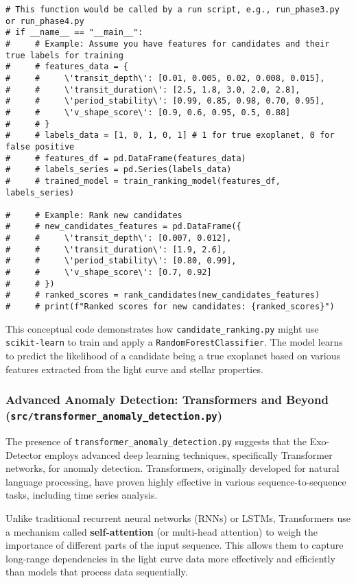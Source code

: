 \documentclass{article}
\begin{document}
\begin{lstlisting}[caption={Conceptual Candidate Ranking Logic}]
# This function would be called by a run script, e.g., run_phase3.py or run_phase4.py
# if __name__ == "__main__":
#     # Example: Assume you have features for candidates and their true labels for training
#     # features_data = {
#     #     \'transit_depth\': [0.01, 0.005, 0.02, 0.008, 0.015],
#     #     \'transit_duration\': [2.5, 1.8, 3.0, 2.0, 2.8],
#     #     \'period_stability\': [0.99, 0.85, 0.98, 0.70, 0.95],
#     #     \'v_shape_score\': [0.9, 0.6, 0.95, 0.5, 0.88]
#     # }
#     # labels_data = [1, 0, 1, 0, 1] # 1 for true exoplanet, 0 for false positive
#     # features_df = pd.DataFrame(features_data)
#     # labels_series = pd.Series(labels_data)
#     # trained_model = train_ranking_model(features_df, labels_series)

#     # Example: Rank new candidates
#     # new_candidates_features = pd.DataFrame({
#     #     \'transit_depth\': [0.007, 0.012],
#     #     \'transit_duration\': [1.9, 2.6],
#     #     \'period_stability\': [0.80, 0.99],
#     #     \'v_shape_score\': [0.7, 0.92]
#     # })
#     # ranked_scores = rank_candidates(new_candidates_features)
#     # print(f"Ranked scores for new candidates: {ranked_scores}")
\end{lstlisting}

This conceptual code demonstrates how \texttt{candidate\_ranking.py} might use \texttt{scikit-learn} to train and apply a \texttt{RandomForestClassifier}. The model learns to predict the likelihood of a candidate being a true exoplanet based on various features extracted from the light curve and stellar properties.

\subsubsection{Advanced Anomaly Detection: Transformers and Beyond (\texttt{src/transformer\_anomaly\_detection.py})}

The presence of \texttt{transformer\_anomaly\_detection.py} suggests that the Exo-Detector employs advanced deep learning techniques, specifically Transformer networks, for anomaly detection. Transformers, originally developed for natural language processing, have proven highly effective in various sequence-to-sequence tasks, including time series analysis.

Unlike traditional recurrent neural networks (RNNs) or LSTMs, Transformers use a mechanism called \textbf{self-attention} (or multi-head attention) to weigh the importance of different parts of the input sequence. This allows them to capture long-range dependencies in the light curve data more effectively and efficiently than models that process data sequentially.
\end{document}
